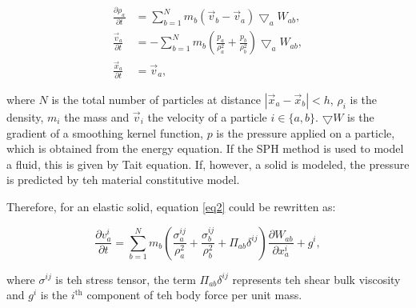 \begin{subequations}
\begin{align}
\frac{\partial\rho_a}{\partial t}&=\sum_{b=1}^N m_b\left( \vec v_b- \vec v_a\right) \bigtriangledown_a W_{ab},
\label{eq1}\\
\frac{\vec v_a}{\partial t}&=-\sum_{b=1}^N m_b\left( \frac{p_a}{\rho_a^2}+\frac{p_b}{\rho_b^2}\right) \bigtriangledown_a W_{ab},
\label{eq2}\\
\frac{\vec x_a}{\partial t}&=\vec v_a,
\label{eq3}
\end{align}
\end{subequations}

where $N$ is the total number of particles at distance $|\vec x_a-\vec x_b|<h$, $\rho_i$ is the density, $m_i$ the mass and $\vec v_i$ the velocity of a particle $i \in \{a,b\}$. $\bigtriangledown W$ is the gradient of a smoothing kernel function, $p$ is the pressure applied on a particle, {\color{red} which is obtained from the energy equation. If the SPH method is used to model a fluid, this is given by Tait equation. If, however, a solid is modeled, the pressure is predicted by teh material constitutive model.}

Therefore, for an elastic solid, equation \ref{eq2} could be rewritten as:

\begin{equation}
\frac{\partial v_a^i}{\partial t}=\sum_{b=1}^N m_b\left( \frac{\sigma_a^{ij}}{\rho_a^2}+\frac{\sigma_b^{ij}}{\rho_b^2}+\Pi_{ab}\delta^{ij}\right) \frac{\partial W_{ab}}{\partial x_a^i} +g^i,
\label{eq2_2}
\end{equation}

where $\sigma^{ij}$ is teh stress tensor, the term $\Pi_{ab}\delta^{ij}$ represents teh shear bulk viscosity and $g^i$ is the $i^{\text{th}}$ component of teh body force per unit mass.






